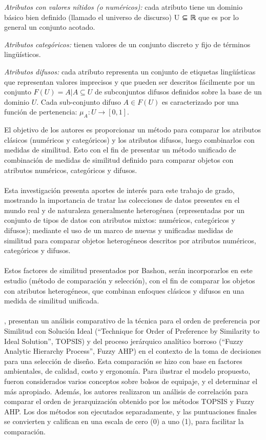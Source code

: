 \begin{viñetas}
\item \textit{Atributos con valores nítidos (o numéricos):} cada atributo tiene un dominio básico bien definido (llamado el universo de discurso) U ⊆ ℝ que es por lo general un conjunto acotado.
\item \textit{Atributos categóricos:} tienen valores de un conjunto discreto y fijo de términos lingüísticos. 
\item \textit{Atributos difusos:} cada atributo representa un conjunto de etiquetas lingüísticas que representan valores imprecisos y que pueden ser descritos fácilmente por un conjunto $F(U) = {A \vert A \subseteq U}$ de subconjuntos difusos definidos sobre la base de un dominio $U$. Cada sub-conjunto difuso $A \in F(U)$ es caracterizado por una función de  pertenencia: $\mu_{A} :U \rightarrow [0,1]$.
\\
\end{viñetas}
El objetivo de los autores es proporcionar un método para comparar los atributos clásicos (numéricos y categóricos) y  los atributos difusos, luego combinarlos con medidas de similitud. Esto con el fin de presentar un método unificado de combinación de medidas de similitud definido para comparar objetos con atributos numéricos, categóricos y difusos.\\
\\
Esta investigación presenta aportes de interés para este trabajo de grado, mostrando la importancia de tratar las colecciones de datos presentes en el mundo real y de naturaleza generalmente heterogénea (representadas por un conjunto de tipos de datos con atributos mixtos: numéricos, categóricos y difusos); mediante el uso de un marco de nuevas y unificadas medidas de similitud para comparar objetos heterogéneos descritos por atributos numéricos, categóricos y difusos.\\
\\
Estos factores de similitud presentados por Bashon, serán incorporarlos en este estudio (método de comparación y selección), con el fin de  comparar los objetos con atributos heterogéneos, que combinan enfoques clásicos y difusos en una medida de similitud unificada.\\
\\
\citet{Gupta2015fuzzyAhpTopsis}, presentan un análisis comparativo de la técnica para el orden de preferencia por Similitud con Solución Ideal (``Technique for Order of Preference by Similarity to Ideal Solution'', TOPSIS) y del proceso jerárquico analítico borroso (``Fuzzy Analytic Hierarchy Process'', Fuzzy AHP) en el contexto de la toma de decisiones para una selección de diseño. Esta comparación se hizo con base en factores ambientales, de calidad, costo y ergonomía. Para ilustrar el modelo propuesto, fueron considerados varios conceptos sobre bolsos de equipaje, y el determinar el más apropiado. Además, los autores realizaron un análisis de correlación para comparar el orden de jerarquización obtenido por los métodos TOPSIS y Fuzzy AHP. Los dos métodos son ejecutados separadamente, y las puntuaciones finales se convierten y califican en una escala de cero (0) a uno (1), para facilitar la comparación.\\
